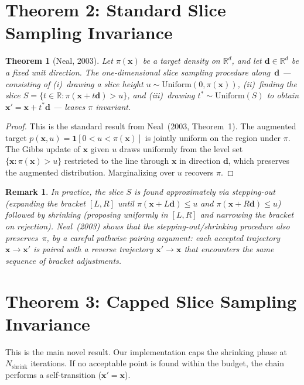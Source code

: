 \documentclass[12pt]{article}
\newtheorem{theorem}{Theorem}
\newtheorem{remark}{Remark}
\newcommand{\R}{\mathbb{R}}
\newcommand{\bx}{\mathbf{x}}
\newcommand{\bd}{\mathbf{d}}
\begin{document}
\section*{Theorem 2: Standard Slice Sampling Invariance}

\begin{theorem}[Neal, 2003]
\label{thm:slice}
Let $\pi(\bx)$ be a target density on $\R^d$, and let $\bd \in \R^d$
be a fixed unit direction. The one-dimensional slice sampling procedure
along~$\bd$ --- consisting of (i)~drawing a slice height
$u \sim \mathrm{Uniform}(0, \pi(\bx))$, (ii)~finding the slice
$S = \{t \in \R : \pi(\bx + t\bd) > u\}$, and (iii)~drawing
$t^* \sim \mathrm{Uniform}(S)$ to obtain $\bx' = \bx + t^*\bd$ ---
leaves $\pi$ invariant.
\end{theorem}

\begin{proof}
This is the standard result from Neal~(2003, Theorem~1). The augmented
target $p(\bx, u) = \mathbf{1}[0 < u < \pi(\bx)]$ is jointly uniform
on the region under $\pi$. The Gibbs update of $\bx$ given $u$ draws
uniformly from the level set $\{\bx : \pi(\bx) > u\}$ restricted to
the line through $\bx$ in direction $\bd$, which preserves the
augmented distribution. Marginalizing over $u$ recovers $\pi$.
\end{proof}

\begin{remark}
In practice, the slice $S$ is found approximately via stepping-out
(expanding the bracket $[L, R]$ until $\pi(\bx + L\bd) \leq u$ and
$\pi(\bx + R\bd) \leq u$) followed by shrinking (proposing uniformly
in $[L, R]$ and narrowing the bracket on rejection). Neal~(2003) shows
that the stepping-out/shrinking procedure also preserves~$\pi$, by a
careful pathwise pairing argument: each accepted trajectory $\bx
\to \bx'$ is paired with a reverse trajectory $\bx' \to \bx$ that
encounters the same sequence of bracket adjustments.
\end{remark}

\section*{Theorem 3: Capped Slice Sampling Invariance}

This is the main novel result. Our implementation caps the shrinking
phase at $N_{\mathrm{shrink}}$ iterations. If no acceptable point is
found within the budget, the chain performs a self-transition
($\bx' = \bx$).
\end{document}
